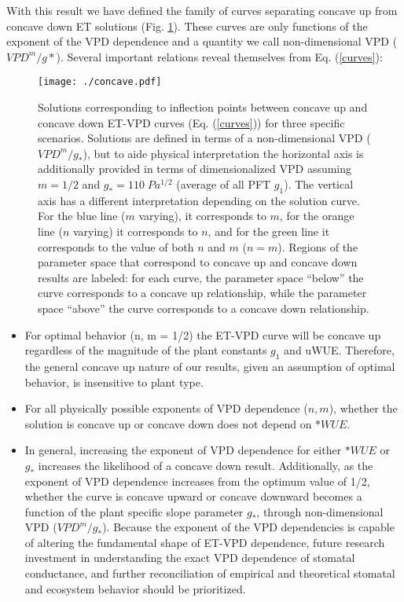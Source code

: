 \documentclass[draft]{agujournal2019}
\begin{document}
With this result we have defined the family of curves separating
concave up from concave down ET solutions (Fig. \ref{concave}). These
curves are only functions of the exponent of the VPD dependence and a
quantity we call non-dimensional VPD ($VPD^m/g*$). Several important
relations reveal themselves from Eq. (\ref{curves}):

\begin{figure}
  \centering
  \centerline{\texttt{[image: ./concave.pdf]}}
  \caption{ Solutions corresponding to inflection points between
    concave up and concave down ET-VPD curves (Eq. (\ref{curves})) for
    three specific scenarios. Solutions are defined in terms of a
    non-dimensional VPD ($VPD^m/g_*$), but to aide physical
    interpretation the horizontal axis is additionally provided in
    terms of dimensionalized VPD assuming $m=1/2$ and
    $g_*=110\; Pa^{1/2}$ (average of all PFT $g_1$). The vertical axis
    has a different interpretation depending on the solution
    curve. For the blue line ($m$ varying), it corresponds to $m$, for
    the orange line ($n$ varying) it corresponds to $n$, and for the
    green line it corresponds to the value of both $n$ and $m$
    ($n=m$). Regions of the parameter space that correspond to concave
    up and concave down results are labeled: for each curve, the
    parameter space ``below'' the curve corresponds to a concave up
    relationship, while the parameter space ``above'' the curve
    corresponds to a concave down relationship.}
  \label{concave}
\end{figure}

\begin{itemize}
  \item For optimal behavior (n, m = 1/2) the ET-VPD curve will be
    concave up regardless of the magnitude of the plant constants
    $g_1$ and uWUE. Therefore, the general concave up nature of our
    results, given an assumption of optimal behavior, is insensitive
    to plant type.
  \item For all physically possible exponents of VPD dependence ($n,
    m$), whether the solution is concave up or concave down does not
    depend on $*WUE$.
  \item In general, increasing the exponent of VPD dependence for
    either $*WUE$ or $g_*$ increases the likelihood of a concave down
    result. Additionally, as the exponent of VPD dependence increases
    from the optimum value of 1/2, whether the curve is concave upward
    or concave downward becomes a function of the plant specific slope
    parameter $g_*$, through non-dimensional VPD
    ($VPD^m/g_*$). Because the exponent of the VPD dependencies is
    capable of altering the fundamental shape of ET-VPD dependence,
    future research investment in understanding the exact VPD
    dependence of stomatal conductance, and further reconciliation of
    empirical and theoretical stomatal and ecosystem behavior should
    be prioritized.
\end{itemize}
\end{document}
